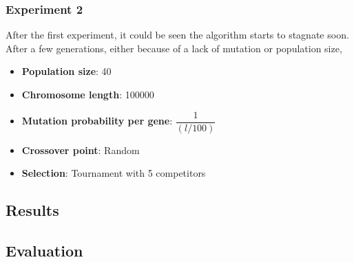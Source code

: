 \documentclass{article}
\begin{document}
\subsubsection{Experiment 2}
After the first experiment, it could be seen the algorithm starts to stagnate soon. After a few generations, either because of a lack of mutation or population size, 
\begin{itemize}
\item \textbf{Population size}: 40
\item \textbf{Chromosome length}: 100000
\item \textbf{Mutation probability per gene}: $\dfrac{1}{(l/100)}$
\item \textbf{Crossover point}: Random
\item \textbf{Selection}: Tournament with 5 competitors
\end{itemize}


\subsection{Results}

\subsection{Evaluation}

\printbibliography
\end{document}
